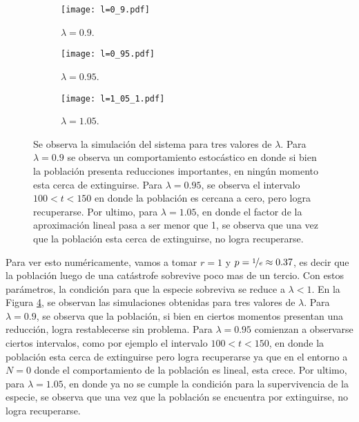 \begin{figure}[hb!]
    \centering
    \begin{subfigure}[b]{0.32\textwidth}
        \texttt{[image: l=0\_9.pdf]}
        \caption{$\lambda=0.9$.}
        \label{05_l_9}
    \end{subfigure}
    \hfill
    \begin{subfigure}[b]{0.32\textwidth}
        \texttt{[image: l=0\_95.pdf]}
        \caption{$\lambda=0.95$.}
        \label{05_l_95}
    \end{subfigure}
    \hfill
    \begin{subfigure}[b]{0.32\textwidth}
        \texttt{[image: l=1\_05\_1.pdf]}
        \caption{$\lambda=1.05$.}
        \label{05_l_105}
    \end{subfigure}
    \caption{Se observa la simulación del sistema para tres valores de $\lambda$. Para $\lambda=0.9$ se observa un comportamiento estocástico en donde si bien la población presenta reducciones importantes, en ningún momento esta cerca de extinguirse. Para $\lambda=0.95$, se observa el intervalo $100<t<150$ en donde la población es cercana a cero, pero logra recuperarse. Por ultimo, para $\lambda=1.05$, en donde el factor de la aproximación lineal pasa a ser menor que 1, se observa que una vez que la población esta cerca de extinguirse, no logra recuperarse.}
    \label{05_ejercicio}
\end{figure}

Para ver esto numéricamente, vamos a tomar $r=1$ y $p=\nicefrac{1}{e}\approx0.37$, es decir que la población luego de una catástrofe sobrevive poco mas de un tercio. Con estos parámetros, la condición para que la especie sobreviva se reduce a $\lambda<1$. En la Figura \ref{05_ejercicio}, se observan las simulaciones obtenidas para tres valores de $\lambda$. Para $\lambda=0.9$, se observa que la población, si bien en ciertos momentos presentan una reducción, logra restablecerse sin problema. Para $\lambda=0.95$ comienzan a observarse ciertos intervalos, como por ejemplo el intervalo $100<t<150$, en donde la población esta cerca de extinguirse pero logra recuperarse ya que en el entorno a $N=0$ donde el comportamiento de la población es lineal, esta crece. Por ultimo, para $\lambda=1.05$, en donde ya no se cumple la condición para la supervivencia de la especie, se observa que una vez que la población se encuentra por extinguirse, no logra recuperarse. 



